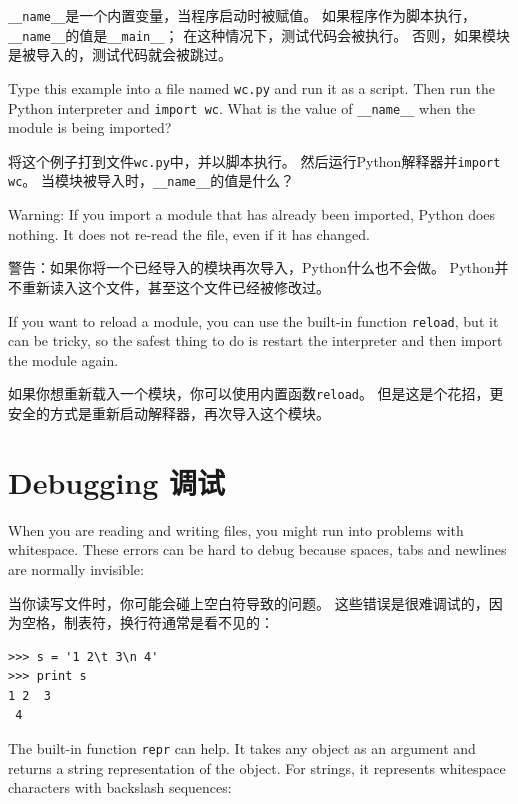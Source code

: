 \documentclass[10pt]{book}
\begin{document}
\begin{CJK}{UTF8}{gbsn}
\verb"__name__"是一个内置变量，当程序启动时被赋值。
如果程序作为脚本执行，\verb"__name__"的值是\verb"__main__"；
在这种情况下，测试代码会被执行。
否则，如果模块是被导入的，测试代码就会被跳过。

\begin{exercise}

Type this example into a file named {\tt wc.py} and run
it as a script.  Then run the Python interpreter and
{\tt import wc}.  What is the value of \verb"__name__"
when the module is being imported?

将这个例子打到文件{\tt wc.py}中，并以脚本执行。
然后运行Python解释器并{\tt import wc}。
当模块被导入时，\verb"__name__"的值是什么？

Warning: If you import a module that has already been imported,
Python does nothing.  It does not re-read the file, even if it has
changed.

警告：如果你将一个已经导入的模块再次导入，Python什么也不会做。
Python并不重新读入这个文件，甚至这个文件已经被修改过。

If you want to reload a module, you can use the built-in function 
{\tt reload}, but it can be tricky, so the safest thing to do is
restart the interpreter and then import the module again.

如果你想重新载入一个模块，你可以使用内置函数{\tt reload}。
但是这是个花招，更安全的方式是重新启动解释器，再次导入这个模块。

\end{exercise}



\section{Debugging 调试}

When you are reading and writing files, you might run into problems
with whitespace.  These errors can be hard to debug because spaces,
tabs and newlines are normally invisible:

当你读写文件时，你可能会碰上空白符导致的问题。
这些错误是很难调试的，因为空格，制表符，换行符通常是看不见的：

\begin{verbatim}
>>> s = '1 2\t 3\n 4'
>>> print s
1 2	 3
 4
\end{verbatim}

The built-in function {\tt repr} can help.  It takes any object as an
argument and returns a string representation of the object.  For
strings, it represents whitespace
characters with backslash sequences:


\end{CJK}
\end{document}
